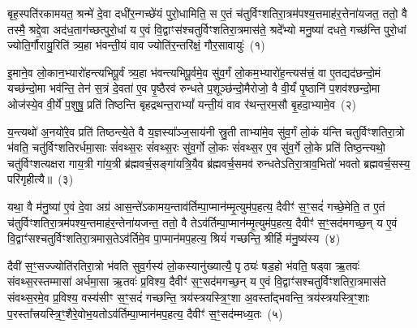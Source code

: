 {\anuvakamend[{वन॒स्पति॑भ्यः॒ स्कन्धो᳚भ्यः शि॒ष्टाय॑ रि॒क्ताय॒ षट्च॑त्वारिꣳशत्}]}%

{\prashnaend[{प्र॒जवं॑ प्र॒जा\-प॑ति॒र्यद॑छन्दो॒मन्ते॑ हुवे सवा॒हमोष॑धीभ्यो॒ द्विच॑त्वारिꣳशत्॥42॥ प्र॒जव॒ꣳ॒ सर्व॑स्मै॒ स्वाहा᳚॥}]}

\setcounter{anuvakam}{0}
बृह॒स्पति॑रकामयत॒ श्रन्मे॑ दे॒वा दधी॑र॒न्गच्छे॑यं पुरो॒धामिति॒ स ए॒तं च॑तुर्विꣳशतिरा॒त्रम॑पश्य॒त्तमाह॑र॒त्तेना॑यजत॒ ततो॒ वै तस्मै॒ श्रद्दे॒वा अद॑ध॒ताग॑च्छत्पुरो॒धां य ए॒वं वि॒द्वाꣳस॑श्चतुर्विꣳशतिरा॒त्रमास॑ते॒ श्रदे᳚भ्यो मनु॒ष्या॑ दधते॒ गच्छ॑न्ति पुरो॒धां ज्योति॒र्गौरायु॒रिति॑ त्र्य॒हा भ॑वन्ती॒यं वाव ज्योति॑र॒न्तरि॑क्षं॒ गौर॒सावायुः॑~(१)

इ॒माने॒व लो॒कान॒भ्यारो॑हन्त्यभिपू॒र्वं त्र्य॒हा भ॑वन्त्यभिपू॒र्वमे॒व सु॑व॒र्गं लो॒कम॒भ्यारो॑ह॒न्त्यस॑त्त्रं॒ वा ए॒तद्यद॑छन्दो॒मं यच्छ॑न्दो॒मा भव॑न्ति॒ तेन॑ स॒त्रं दे॒वता॑ ए॒व पृ॒ष्ठैरव॑ रुन्धते प॒शूञ्छ॑न्दो॒मैरोजो॒ वै वी॒र्यं॑ पृ॒ष्ठानि॑ प॒शव॑श्छन्दो॒मा ओज॑स्ये॒व वी॒र्ये॑ प॒शुषु॒ प्रति॑ तिष्ठन्ति बृहद्रथन्त॒रा\-भ्यां᳚ यन्ती॒यं वाव र॑थन्त॒रम॒सौ बृ॒हदा॒भ्यामे॒व~(२)

य॒न्त्यथो॑ अ॒नयो॑रे॒व प्रति॑ तिष्ठन्त्ये॒ते वै य॒ज्ञस्या᳚ञ्ज॒साय॑नी स्रु॒ती ताभ्या॑मे॒व सु॑व॒र्गं लो॒कं य॑न्ति चतुर्विꣳशतिरा॒त्रो भ॑वति॒ चतु॑र्विꣳशतिरर्धमा॒साः सं॑वथ्स॒रः सं॑वथ्स॒रः सु॑व॒र्गो लो॒कः सं॑वथ्स॒र ए॒व सु॑व॒र्गे लो॒के प्रति॑ तिष्ठ॒न्त्यथो॒ चतु॑र्विꣳशत्यक्षरा गाय॒त्री गा॑य॒त्री ब्र॑ह्मवर्च॒सङ्गा॑यत्रि॒यैव ब्र॑ह्मवर्च॒समव॑ रुन्धते\-ऽतिरा॒त्राव॒भितो॑ भवतो ब्रह्मवर्च॒सस्य॒ परि॑गृहीत्यै॥~(३)

{\anuvakamend[{अ॒सावायु॑रा॒भ्यामे॒व पञ्च॑चत्वारिꣳशच्च}]}%

यथा॒ वै म॑नु॒ष्या॑ ए॒वं दे॒वा अग्र॑ आस॒न्ते॑\-ऽकामय॒न्ताव॑र्तिम्पा॒प्मान॑म्मृ॒त्युम॑प॒हत्य॒ दैवीꣳ॑ स॒ꣳ॒सदं॑ गच्छे॒मेति॒ त ए॒तं च॑तुर्विꣳशतिरा॒त्रम॑पश्य॒न्तमाह॑र॒न्तेना॑यजन्त॒ ततो॒ वै ते\-ऽव॑र्तिम्पा॒प्मान॑म्मृ॒त्युम॑प॒हत्य॒ दैवीꣳ॑ स॒ꣳ॒सद॑मगच्छ॒न् य ए॒वं वि॒द्वाꣳ॑सश्चतुर्विꣳशतिरा॒त्रमास॒ते\-ऽव॑र्तिमे॒व पा॒प्मान॑मप॒हत्य॒ श्रियं॑ गच्छन्ति॒ श्रीर्\mbox{}हि म॑नु॒ष्य॑स्य~(४)

दैवी॑ स॒ꣳ॒सज्ज्योति॑रतिरा॒त्रो भ॑वति सुव॒र्गस्य॑ लो॒कस्यानु॑ख्यात्यै॒ पृठ्यः॑ षड॒हो भ॑वति॒ षड्वा ऋ॒तवः॑ संवथ्स॒रस्तम्मासा॑ अर्धमा॒सा ऋ॒तवः॑ प्र॒विश्य॒ दैवीꣳ॑ स॒ꣳ॒सद॑मगच्छ॒न् य ए॒वं वि॒द्वाꣳ॑सश्चतुर्विꣳशतिरा॒त्रमास॑ते संवथ्स॒रमे॒व प्र॒विश्य॒ वस्य॑सीꣳ स॒ꣳ॒सदं॑ गच्छन्ति॒ त्रय॑स्त्रयस्त्रि॒ꣳ॒शा अ॒वस्ता᳚द्भवन्ति॒ त्रय॑स्त्रयस्त्रि॒ꣳ॒शाः प॒रस्ता᳚त्त्रयस्त्रि॒ꣳ॒शैरे॒वोभ॒यतो\-ऽव॑र्तिम्पा॒प्मान॑मप॒हत्य॒ दैवीꣳ॑ स॒ꣳ॒सद॑म्मध्य॒तः~(५)

